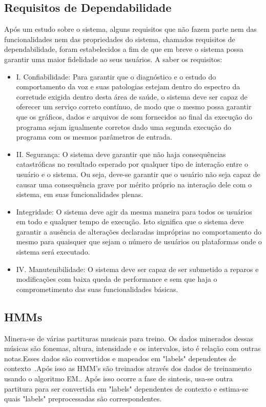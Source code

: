 		\subsection{Requisitos de Dependabilidade}
		
		Após um estudo sobre o sistema, alguns requisitos que não fazem parte nem das funcionalidades nem das propriedades do sistema, chamados requisitos de dependabilidade, foram estabelecidos a ﬁm de que em breve o sistema possa garantir uma maior ﬁdelidade ao seus usuários. A saber os requisitos:
		
		\begin{itemize}
			\item I. Conﬁabilidade: Para garantir que o diagnóstico e o estudo do comportamento da voz e suas patologias estejam dentro do espectro da corretude exigida dentro desta área de saúde, o sistema deve ser capaz de oferecer um serviço correto contínuo, de modo que o mesmo possa garantir que os gráﬁcos, dados e arquivos de som fornecidos ao ﬁnal da execução do programa sejam igualmente corretos dado uma segunda execução do programa com os mesmos parâmetros de entrada. 
			\item  II. Segurança: O sistema deve garantir que não haja consequências catastróﬁcas no resultado esperado por qualquer tipo de interação entre o usuário e o sistema. Ou seja, deve-se garantir que o usuário não seja capaz de causar uma consequência grave por mérito próprio na interação dele com o sistema, em suas funcionalidades plenas. 
			\item Integridade: O sistema deve agir da mesma maneira para todos os usuários em todo e qualquer tempo de execução. Isto signiﬁca que o sistema deve garantir a ausência de alterações declaradas impróprias no comportamento do mesmo para quaisquer que sejam o número de usuários ou plataformas onde o sistema será executado.
			\item  IV. Manutenibilidade: O sistema deve ser capaz de ser submetido a reparos e modiﬁcações com baixa queda de performance e sem que haja o comprometimento das suas funcionalidades básicas.
			
		\end{itemize}
	

	
	
	\subsection{HMMs}
		Minera-se de várias partituras musicais para treino. Os dados minerados dessas músicas são fonemas, altura, intensidade e os intervalos, isto é relação com outras notas.Esses dados são convertidos e mapeados em "labels" dependentes de contexto~\cite{DegottexNada}.Após isso as HMM's são treinados através dos dados de treinamento usando o algoritmo EM.\cite{GudnasonNada}. Após isso ocorre a fase de sintesis, usa-se outra partitura para ser convertida em "labels" dependentes de contexto e estima-se quais "labels" preprocessadas são correspondentes.\cite{TakashiNose}
	
